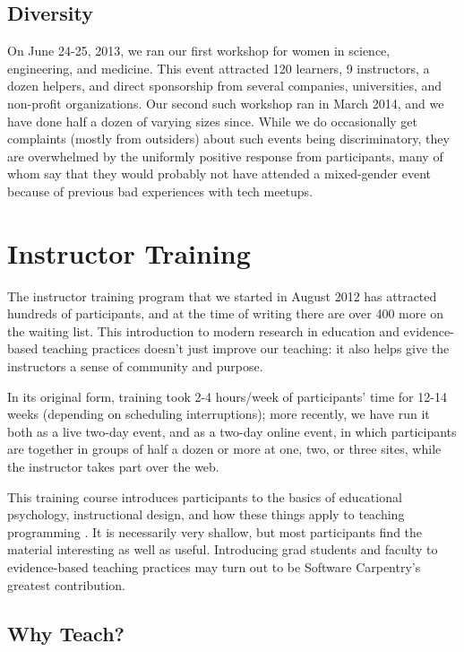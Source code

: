 \documentclass[10pt,a4paper,twocolumn]{article}
\begin{document}
\subsection{Diversity}

On June 24-25, 2013, we ran our first workshop for women in science,
engineering, and medicine. This event attracted 120 learners, 9
instructors, a dozen helpers, and direct sponsorship from several
companies, universities, and non-profit organizations. Our second such
workshop ran in March 2014, and we have done half a dozen of varying
sizes since.  While we do occasionally get complaints (mostly from
outsiders) about such events being discriminatory, they are
overwhelmed by the uniformly positive response from participants, many
of whom say that they would probably not have attended a mixed-gender
event because of previous bad experiences with tech meetups.

\section{Instructor Training}\label{s:instructor-training}

The instructor training program that we started in August 2012 has
attracted hundreds of participants, and at the time of writing there
are over 400 more on the waiting list.  This introduction to modern
research in education and evidence-based teaching practices
\cite{hlw2010} doesn't just improve our teaching: it also helps give
the instructors a sense of community and purpose.

In its original form, training took 2-4 hours/week of participants'
time for 12-14 weeks (depending on scheduling interruptions); more
recently, we have run it both as a live two-day event, and as a
two-day online event, in which participants are together in groups of
half a dozen or more at one, two, or three sites, while the instructor
takes part over the web.

This training course introduces participants to the basics of
educational psychology, instructional design, and how these things
apply to teaching programming
\cite{guzdial2010,guzdial2013,hazzan2011,porter2013,sorva2012}. It is
necessarily very shallow, but most participants find the material
interesting as well as useful.  Introducing grad students and faculty
to evidence-based teaching practices may turn out to be Software
Carpentry's greatest contribution.

\subsection{Why Teach?}
\end{document}
